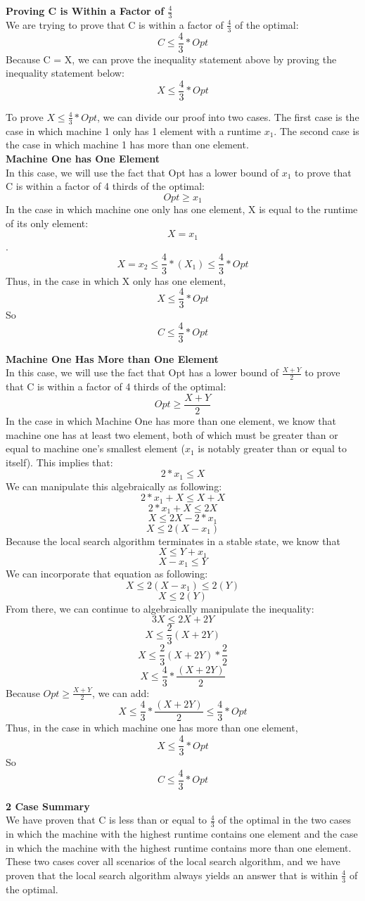 \documentclass[11pt, solution, letterpaper]{format}
\begin{document}
\textbf{Proving C is Within a Factor of $\frac{4}{3}$}\\
We are trying to prove that C is within a factor of $\frac{4}{3}$ of the optimal:
 $$  C \leq \frac{4}{3} * Opt $$
Because C = X, we can prove the inequality statement above by proving the inequality statement below:
$$ X \leq \frac{4}{3} * Opt $$

To prove $ X \leq \frac{4}{3} * Opt $, we can divide our proof into two cases. The first case is the case in which machine 1 only has 1 element with a runtime $x_1$. The second case is the case in which machine 1 has more than one element.\\

\textbf{Machine One has One Element}\\
In this case, we will use the fact that Opt has a lower bound of $x_1$ to prove that C is within a factor of 4 thirds of the optimal: $$Opt \geq x_1$$
In the case in which machine one only has one element, X is equal to the runtime of its only element:
$$X = x_1$$. 
$$X = x_2 \leq \frac{4}{3}*(X_1) \leq \frac{4}{3}*Opt$$
Thus, in the case in which X only has one element,
$$ X \leq \frac{4}{3} * Opt $$
So
 $$  C \leq \frac{4}{3} * Opt $$
 
 \textbf{Machine One Has More than One Element}\\
 In this case, we will use the fact that Opt has a lower bound of $\frac{X + Y}{2}$ to prove that C is within a factor of 4 thirds of the optimal: $$Opt \geq \frac{X + Y}{2}$$
 In the case in which Machine One has more than one element, we know that machine one has at least two element, both of which must be greater than or equal to machine one's smallest element ($x_1$ is notably greater than or equal to itself). This implies that:
 $$2*x_1 \leq X$$ 
 We can manipulate this algebraically as following:
  $$2*x_1 + X \leq X + X$$ 
$$2*x_1 + X \leq 2X$$ 
$$X \leq 2X - 2*x_1$$ 
$$X \leq 2(X - x_1)$$ 
 Because the local search algorithm terminates in a stable state, we know that $$X \leq Y + x_1$$ $$X - x_1 \leq Y$$
 We can incorporate that equation as following:  
 $$X \leq 2(X - x_1) \leq 2(Y)$$ 
 $$X \leq 2(Y)$$ 
 From there, we can continue to algebraically manipulate the inequality:
  $$3X \leq 2X + 2Y$$   
  $$X \leq \frac{2}{3}(X + 2Y)$$ 
  $$X \leq \frac{2}{3}(X + 2Y) * \frac{2}{2}$$ 
  $$X \leq \frac{4}{3}* \frac{(X + 2Y)}{2}$$
  Because $Opt \geq \frac{X + Y}{2}$, we can add:
  $$X \leq \frac{4}{3}* \frac{(X + 2Y)}{2} \leq \frac{4}{3} * Opt $$
  Thus, in the case in which machine one has more than one element,
$$ X \leq \frac{4}{3} * Opt $$
So
 $$  C \leq \frac{4}{3} * Opt $$

\textbf{2 Case Summary}\\
We have proven that C is less than or equal to $\frac{4}{3}$ of the optimal in the two cases in which the machine with the highest runtime contains one element and the case in which the machine with the highest runtime contains more than one element. These two cases cover all scenarios of the local search algorithm, and we have proven that the local search algorithm always yields an answer that is within $\frac{4}{3}$ of the optimal.
 
\end{document}
